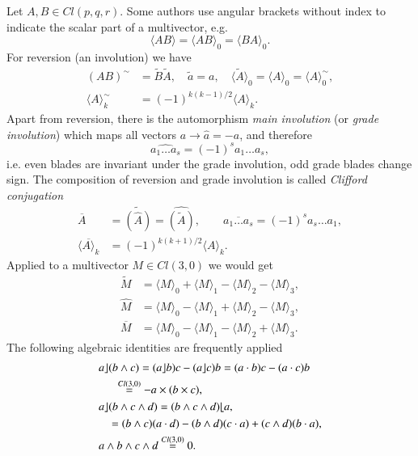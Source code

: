 \documentclass[cameraready]{jcmsi}%
\newcommand{\be}{\begin{equation}}
\newcommand{\ee}{\end{equation}}
\begin{document}
Let $A,B \in Cl(p,q,r)$. 
Some authors use angular brackets without index to indicate the scalar part of a multivector, e.g.
\be 
  \langle AB \rangle = \langle AB \rangle_0 = \langle BA \rangle_0. 
\ee 
For reversion (an involution) we have
\begin{align} 
  (AB)^{\sim} &= \widetilde{B} \widetilde{A}, \quad
  \tilde{a}=a, \quad
  \langle \widetilde{A} \rangle_0=\langle A \rangle_0=\langle A \rangle_0^{\sim}, 
  \nonumber \\
  \langle A \rangle_k^{\sim} &= (-1)^{k(k-1)/2}\langle A \rangle_k.
\end{align} 
Apart from reversion, there is the automorphism \textit{main involution} (or \textit{grade involution}) which maps all vectors $a \rightarrow \hat{a}=-a$, and therefore
\be 
  \widehat{a_1 \ldots a_s} = (-1)^s a_1 \ldots a_s,
\ee 
i.e. even blades are invariant under the grade involution, odd grade blades change sign. 
The composition of reversion and grade involution is called \textit{Clifford conjugation}
\begin{align} 
  \overline{A}&=\widetilde{(\hat{A})} = \widehat{(\tilde{A})}, \qquad
  \overline{a_1 \ldots a_s} = (-1)^s a_s \ldots a_1, 
  \nonumber \\
  \overline{\langle A \rangle_k} &= (-1)^{k(k+1)/2}\langle A \rangle_k.
\end{align} 
Applied to a multivector $M \in Cl(3,0)$ we would get
\begin{align} 
  \widetilde{M} 
  &= \langle M \rangle_0 + \langle M \rangle_1 -\langle M \rangle_2 -\langle M \rangle_3,
  \nonumber \\
  \widehat{M} 
  &= \langle M \rangle_0 - \langle M \rangle_1 +\langle M \rangle_2 -\langle M \rangle_3,
  \nonumber \\
  \overline{M} 
  &= \langle M \rangle_0 - \langle M \rangle_1 -\langle M \rangle_2 +\langle M \rangle_3.
\end{align} 
The following algebraic identities \cite{DH:NFCM} are frequently applied
\begin{align}
  &a\rfloor (b\wedge c)
  = (a\rfloor b)c -(a\rfloor c)b
  = (a\cdot b)c -(a\cdot c)b
  \nonumber \\
  &\hspace*{5mm}\stackrel{Cl(3,0)}{=} -a\times (b\times c),
  \\
  &a\rfloor (b\wedge c \wedge d)
  = (b\wedge c \wedge d)\lfloor a,
  \\
  &\hspace*{3mm}= (b\wedge c)(a\cdot d)-(b\wedge d)(c\cdot a)+(c\wedge d)(b\cdot a),
  \nonumber \\
  &a\wedge b \wedge c \wedge d \stackrel{Cl(3,0)}{=}0.
\end{align}
\end{document}
